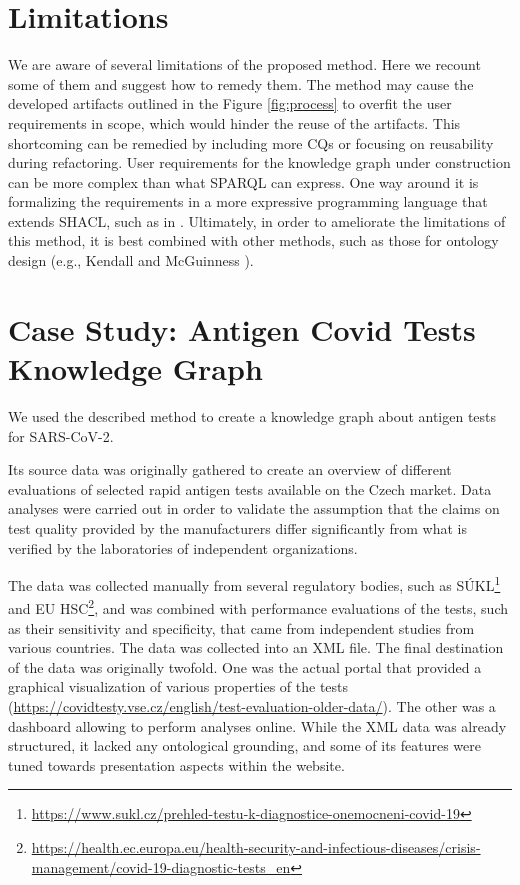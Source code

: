\documentclass[
]{ceurart}
\begin{document}
\section{Limitations}
We are aware of several limitations of the proposed method. Here we recount some of them and suggest how to remedy them. The method may cause the developed artifacts outlined in the Figure \ref{fig:process} to overfit the user requirements in scope, which would hinder the reuse of the artifacts. This shortcoming can be remedied by including more CQs or focusing on reusability during refactoring. User requirements for the knowledge graph under construction can be more complex than what SPARQL can express. One way around it is formalizing the requirements in a more expressive programming language that extends SHACL, such as in \cite{SHACLJS2017}. Ultimately, in order to ameliorate the limitations of this method, it is best combined with other methods, such as those for ontology design (e.g., Kendall and McGuinness \cite{Kendall2019}).

\section{Case Study: Antigen Covid Tests Knowledge Graph}

We used the described method to create a knowledge graph about antigen tests for SARS-CoV-2. 

Its source data was originally gathered to create an overview of different evaluations of selected rapid antigen tests available on the Czech market. 
Data analyses were carried out  \cite{Kliegr2022} in order to validate the assumption that the claims on test quality provided by the manufacturers differ significantly from what is verified by the laboratories of independent organizations.

The data was collected manually from several regulatory bodies, such as SÚKL\footnote{\url{https://www.sukl.cz/prehled-testu-k-diagnostice-onemocneni-covid-19}} and EU HSC\footnote{\url{https://health.ec.europa.eu/health-security-and-infectious-diseases/crisis-management/covid-19-diagnostic-tests_en}}, and was combined with performance evaluations of the tests, such as their sensitivity and specificity, that came from independent studies from various countries. 
The data was collected into an XML file. 
The final destination of the data was originally twofold.
One was the actual portal that provided a graphical visualization of various properties of the tests (\url{https://covidtesty.vse.cz/english/test-evaluation-older-data/}).
The other was a dashboard allowing to perform analyses online.
While the XML data was already structured, it lacked any ontological grounding, and some of its features were tuned towards presentation aspects within the website.
\end{document}
